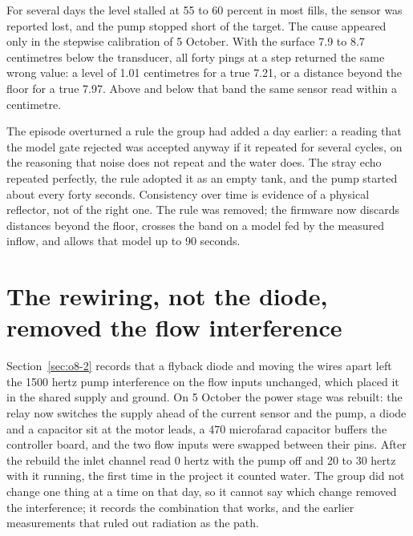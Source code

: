 For several days the level stalled at 55 to 60 percent in most fills, the sensor was reported lost, and the pump stopped short of the target. The cause appeared only in the stepwise calibration of 5 October. With the surface 7.9 to 8.7 centimetres below the transducer, all forty pings at a step returned the same wrong value: a level of 1.01 centimetres for a true 7.21, or a distance beyond the floor for a true 7.97. Above and below that band the same sensor read within a centimetre.

The episode overturned a rule the group had added a day earlier: a reading that the model gate rejected was accepted anyway if it repeated for several cycles, on the reasoning that noise does not repeat and the water does. The stray echo repeated perfectly, the rule adopted it as an empty tank, and the pump started about every forty seconds. Consistency over time is evidence of a physical reflector, not of the right one. The rule was removed; the firmware now discards distances beyond the floor, crosses the band on a model fed by the measured inflow, and allows that model up to 90 seconds.

\section{The rewiring, not the diode, removed the flow interference}

Section~\ref{sec:o8-2} records that a flyback diode and moving the wires apart left the 1500 hertz pump interference on the flow inputs unchanged, which placed it in the shared supply and ground. On 5 October the power stage was rebuilt: the relay now switches the supply ahead of the current sensor and the pump, a diode and a capacitor sit at the motor leads, a 470 microfarad capacitor buffers the controller board, and the two flow inputs were swapped between their pins. After the rebuild the inlet channel read 0 hertz with the pump off and 20 to 30 hertz with it running, the first time in the project it counted water. The group did not change one thing at a time on that day, so it cannot say which change removed the interference; it records the combination that works, and the earlier measurements that ruled out radiation as the path.
